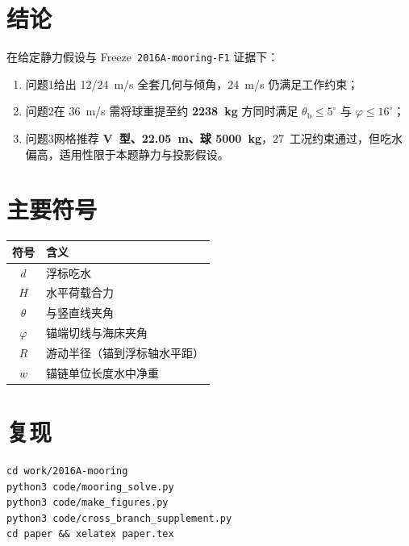 \documentclass[UTF8,a4paper,12pt]{ctexart}
\begin{document}
\section{结论}

在给定静力假设与 Freeze~\texttt{2016A-mooring-F1} 证据下：
\begin{enumerate}[leftmargin=1.5em]
  \item 问题1给出 12/\SI{24}{m/s} 全套几何与倾角，\SI{24}{m/s} 仍满足工作约束；
  \item 问题2在 \SI{36}{m/s} 需将球重提至约 \textbf{\SI{2238}{kg}} 方同时满足 \(\theta_{\mathrm{b}}\le5^\circ\) 与 \(\varphi\le16^\circ\)；
  \item 问题3网格推荐 \textbf{V~型、\SI{22.05}{m}、球 \SI{5000}{kg}}，27~工况约束通过，但吃水偏高，适用性限于本题静力与投影假设。
\end{enumerate}

\appendix
\section{主要符号}
\begin{table}[H]
\centering
\begin{tabular}{cl}
\toprule
符号 & 含义 \\
\midrule
\(d\) & 浮标吃水 \\
\(H\) & 水平荷载合力 \\
\(\theta\) & 与竖直线夹角 \\
\(\varphi\) & 锚端切线与海床夹角 \\
\(R\) & 游动半径（锚到浮标轴水平距） \\
\(w\) & 锚链单位长度水中净重 \\
\bottomrule
\end{tabular}
\end{table}

\section{复现}
\begin{verbatim}
cd work/2016A-mooring
python3 code/mooring_solve.py
python3 code/make_figures.py
python3 code/cross_branch_supplement.py
cd paper && xelatex paper.tex
\end{verbatim}
\end{document}
